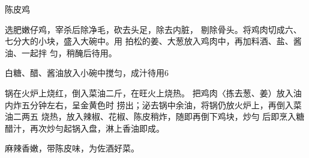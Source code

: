\begin{recipe}{陈皮鸡}

\ingredients


\cooking

\step 	选肥嫩仔鸡，宰杀后除净毛，砍去头足，除去内脏， 剔除骨头。将鸡肉切成六、七分大的小块，盛入大碗中。用 拍松的姜、大葱放入鸡肉中，再加料酒、盐、酱油、一起拌 匀，稍醃后待用。

\step 	白糖、醋、酱油放入小碗中搅匀，成汁待用6

\step 锅在火炉上烧红，倒入菜油二斤，在旺火上烧热。 把鸡肉〈拣去葱、姜）放入油内炸五分钟左右，呈金黄色时 捞出；泌去锅中余油，将锅仍放火炉上，再倒入菜油二两五 烧热，放入辣椒、花椒、陈皮稍炸，随即再倒下鸡块，炒勻 后即烹入糖醋汁，再次炒勻起锅入盘，淋上香油即成。

\notes

麻辣香嫩，带陈皮味，为佐酒好菜。

\end{recipe}

